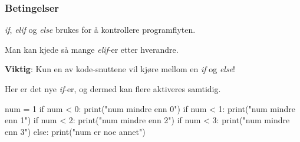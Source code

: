\begin{frame}[fragile]
    \frametitle{Betingelser}

    \textit{if}, \textit{elif} og \textit{else} brukes for å kontrollere programflyten. 

    Man kan kjede så mange \textit{elif}-er etter hverandre. 

    \textbf{Viktig}: Kun en av kode-snuttene vil kjøre mellom en \textit{if} og \textit{else}! 

    Her er det nye \textit{if}-er, og dermed kan flere aktiveres samtidig.

\begin{python}
num = 1
if num < 0:
    print("num mindre enn 0")
if num < 1:
    print("num mindre enn 1")
if num < 2:
    print("num mindre enn 2")
if num < 3:
    print("num mindre enn 3")
else:
    print("num er noe annet")
\end{python}

\end{frame}


